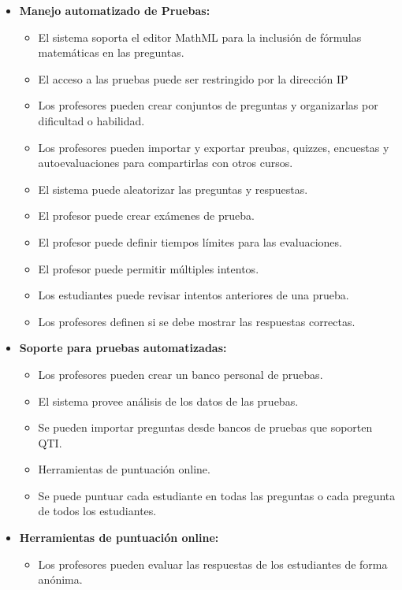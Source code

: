 	\begin{itemize}	
		\item \textbf{Manejo automatizado de Pruebas:}
			\begin{itemize}
				\item El sistema soporta el editor MathML para la inclusión de fórmulas matemáticas en las preguntas.
				\item El acceso a las pruebas puede ser restringido por la dirección IP
				\item Los profesores pueden crear conjuntos de preguntas y organizarlas por dificultad o habilidad.
				\item Los profesores pueden importar y exportar preubas, quizzes, encuestas y autoevaluaciones para compartirlas con otros cursos.
				\item El sistema puede aleatorizar las preguntas  y respuestas.
				\item El profesor puede crear exámenes de prueba.
				\item El profesor puede definir tiempos límites para las evaluaciones.
				\item El profesor puede permitir múltiples intentos.
				\item Los estudiantes puede revisar intentos anteriores de una prueba.
				\item Los profesores definen si se debe mostrar las respuestas correctas.
			\end{itemize}
	\end{itemize}
	\begin{itemize}
		\item \textbf{Soporte para pruebas automatizadas:}
			\begin{itemize}
				\item Los profesores pueden crear un banco personal de pruebas.
				\item El sistema provee análisis de los datos de las pruebas.
				\item Se pueden importar preguntas desde bancos de pruebas que soporten QTI.
				\item Herramientas de puntuación online.
				\item Se puede puntuar cada estudiante en todas las preguntas o cada pregunta de todos los estudiantes.
			\end{itemize}
	\end{itemize}
	\begin{itemize}
		\item \textbf{Herramientas de puntuación online:}
			\begin{itemize}
				\item Los profesores pueden evaluar las respuestas de los estudiantes de forma anónima.
			\end{itemize}
	\end{itemize}
